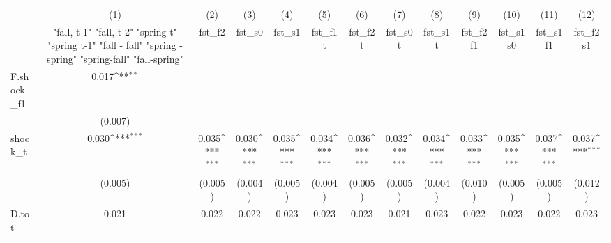 {
\def\sym#1{\ifmmode^{#1}\else\(^{#1}\)\fi}
\begin{tabular}{l*{12}{c}}
\toprule
            &\multicolumn{1}{c}{(1)}&\multicolumn{1}{c}{(2)}&\multicolumn{1}{c}{(3)}&\multicolumn{1}{c}{(4)}&\multicolumn{1}{c}{(5)}&\multicolumn{1}{c}{(6)}&\multicolumn{1}{c}{(7)}&\multicolumn{1}{c}{(8)}&\multicolumn{1}{c}{(9)}&\multicolumn{1}{c}{(10)}&\multicolumn{1}{c}{(11)}&\multicolumn{1}{c}{(12)}\\
            &\multicolumn{1}{c}{  "fall, t-1" "fall, t-2" "spring t" "spring t-1"  "fall - fall" "spring - spring" "spring-fall" "fall-spring" }&\multicolumn{1}{c}{fst\_f2}&\multicolumn{1}{c}{fst\_s0}&\multicolumn{1}{c}{fst\_s1}&\multicolumn{1}{c}{fst\_f1t}&\multicolumn{1}{c}{fst\_f2t}&\multicolumn{1}{c}{fst\_s0t}&\multicolumn{1}{c}{fst\_s1t}&\multicolumn{1}{c}{fst\_f2f1}&\multicolumn{1}{c}{fst\_s1s0}&\multicolumn{1}{c}{fst\_s1f1}&\multicolumn{1}{c}{fst\_f2s1}\\
\midrule
F.shock\_f1  &       0.017\sym{**} &                     &                     &                     &                     &                     &                     &                     &                     &                     &                     &                     \\
            &     (0.007)         &                     &                     &                     &                     &                     &                     &                     &                     &                     &                     &                     \\
\addlinespace
shock\_t     &       0.030\sym{***}&       0.035\sym{***}&       0.030\sym{***}&       0.035\sym{***}&       0.034\sym{***}&       0.036\sym{***}&       0.032\sym{***}&       0.034\sym{***}&       0.033\sym{***}&       0.035\sym{***}&       0.037\sym{***}&       0.037\sym{***}\\
            &     (0.005)         &     (0.005)         &     (0.004)         &     (0.005)         &     (0.004)         &     (0.005)         &     (0.005)         &     (0.004)         &     (0.010)         &     (0.005)         &     (0.005)         &     (0.012)         \\
\addlinespace
D.tot       &       0.021         &       0.022         &       0.022         &       0.023         &       0.023         &       0.023         &       0.021         &       0.023         &       0.022         &       0.023         &       0.022         &       0.023         \\

\end{tabular}}
